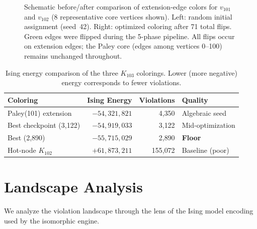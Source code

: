 \documentclass[11pt,a4paper]{article}
\theoremstyle{plain}
\theoremstyle{remark}
\begin{document}
\begin{figure}[H]
\caption{Schematic before/after comparison of extension-edge colors
  for $v_{101}$ and $v_{102}$ (8 representative core vertices shown).
  Left: random initial assignment (seed~42). Right: optimized coloring
  after 71 total flips. Green edges were flipped during the 5-phase
  pipeline. All flips occur on extension edges; the Paley core
  (edges among vertices 0--100) remains unchanged throughout.}
\label{fig:before-after}
\end{figure}

\begin{table}[H]
\centering
\caption{Ising energy comparison of the three $K_{103}$ colorings.
  Lower (more negative) energy corresponds to fewer violations.}
\label{tab:ising-energy}
\small
\begin{tabular}{@{}lrrl@{}}
\toprule
\textbf{Coloring} & \textbf{Ising Energy} & \textbf{Violations}
  & \textbf{Quality} \\
\midrule
Paley(101) extension & $-54{,}321{,}821$ & 4{,}350 & Algebraic seed \\
Best checkpoint (3{,}122) & $-54{,}919{,}033$ & 3{,}122 & Mid-optimization \\
Best (2{,}890) & $-55{,}715{,}029$ & 2{,}890 & \textbf{Floor} \\
\midrule
Hot-node $K_{102}$ & $+61{,}873{,}211$ & 155{,}072 & Baseline (poor) \\
\bottomrule
\end{tabular}
\end{table}

\section{Landscape Analysis}
\label{sec:landscape}

We analyze the violation landscape through the lens of the Ising
model encoding used by the isomorphic engine.
\end{document}
